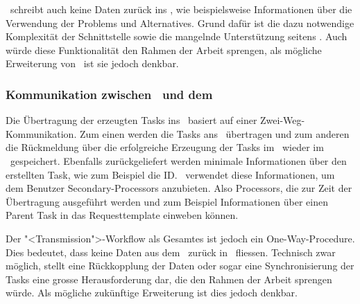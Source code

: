 				\eeppi\ schreibt auch keine Daten zurück ins \dks, wie beispielsweise Informationen über die Verwendung der Problems und Alternatives.
				Grund dafür ist die dazu notwendige Komplexität der Schnittstelle sowie die mangelnde Unterstützung seitens \dks.
				Auch würde diese Funktionalität den Rahmen der Arbeit sprengen, als mögliche Erweiterung von \eeppi\ ist sie jedoch denkbar.
				
			
			\subsubsection{Kommunikation zwischen \eeppi\ und dem \ppt}
				Die Übertragung der erzeugten Tasks ins \ppt\ basiert auf einer Zwei-Weg-Kommunikation.
				Zum einen werden die Tasks ans \ppt\ übertragen
				und zum anderen die Rückmeldung über die erfolgreiche Erzeugung der Tasks im \ppt\ wieder im \eeppi\ gespeichert.
				Ebenfalls zurückgeliefert werden minimale Informationen über den erstellten Task, 
				wie zum Beispiel die ID. 
				\eeppi\ verwendet diese Informationen, um dem Benutzer Secondary-Processors anzubieten.
				Also Processors, die zur Zeit der Übertragung ausgeführt werden und zum Beispiel Informationen über einen Parent Task in das Requesttemplate einweben können.
				
				Der "<Transmission">-Workflow als Gesamtes ist jedoch ein One-Way-Procedure.
				Dies bedeutet, dass keine Daten aus dem \ppt\ zurück in \eeppi\ fliessen.
				Technisch zwar möglich, stellt eine Rückkopplung der Daten oder sogar eine Synchronisierung der Tasks eine grosse Herausforderung dar, 
				die den Rahmen der Arbeit sprengen würde.
				Als mögliche zukünftige Erweiterung ist dies jedoch denkbar.